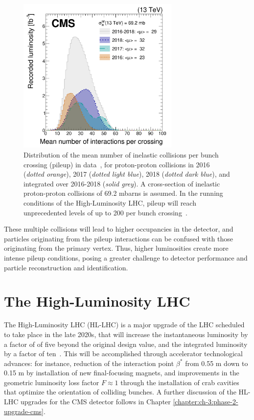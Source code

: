 \begin{figure}[ht]
    \centering
    \includegraphics[width=8cm]{figures/ch-2-cern-cms/pileup-run-2-CMS-JME-18-001_Figure_001.png}
    \caption[Distribution of the mean number of inelastic collisions per bunch crossing (pileup) in data, for proton-proton collisions in 2016-2018]{Distribution of the mean number of inelastic collisions per bunch crossing (pileup) in data~\cite{CMS-JME-18-001}, for proton-proton collisions in 2016 (\textit{dotted orange}), 2017 (\textit{dotted light blue}), 2018 (\textit{dotted dark blue}), and integrated over 2016-2018 (\textit{solid grey}). A cross-section of inelastic proton-proton collisions of 69.2 mbarns is assumed. In the running conditions of the High-Luminosity LHC, pileup will reach unprecedented levels of up to 200 per bunch crossing~\cite{CERN-2020-010-HL-LHC-TDR}.}
    \label{fig:pileup-run-2}
\end{figure}

These multiple collisions will lead to higher occupancies in the detector, and particles originating from the pileup interactions can be confused with those originating from the primary vertex. Thus, higher luminosities create more intense pileup conditions, posing a greater challenge to detector performance and particle reconstruction and identification.


\section{The High-Luminosity LHC}
\label{section:HL-LHC}
The High-Luminosity LHC (HL-LHC) is a major upgrade of the LHC scheduled to take place in the late 2020s, that will increase the instantaneous luminosity by a factor of of five beyond the original design value, and the integrated luminosity by a factor of ten~\cite{CERN-2020-010-HL-LHC-TDR}. This will be accomplished through accelerator technological advances: for instance, reduction of the interaction point $\beta^*$ from 0.55 m down to 0.15 m by installation of new final-focusing magnets, and improvements in the geometric luminosity loss factor $F \approx 1$ through the installation of crab cavities that optimize the orientation of colliding bunches. A further discussion of the HL-LHC upgrades for the CMS detector follows in Chapter \ref{chapter:ch-3:phase-2-upgrade-cms}.

